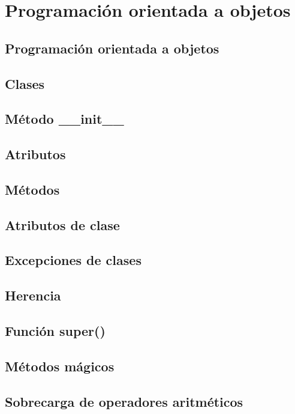 \documentclass{article}
\begin{document}
\section{Programación orientada a objetos}

\subsection{Programación orientada a objetos}

\subsection{Clases}

\subsection{Método __init__}

\subsection{Atributos}

\subsection{Métodos}

\subsection{Atributos de clase}

\subsection{Excepciones de clases}

\subsection{Herencia}

\subsection{Función super()}

\subsection{Métodos mágicos}

\subsection{Sobrecarga de operadores aritméticos}
\end{document}
